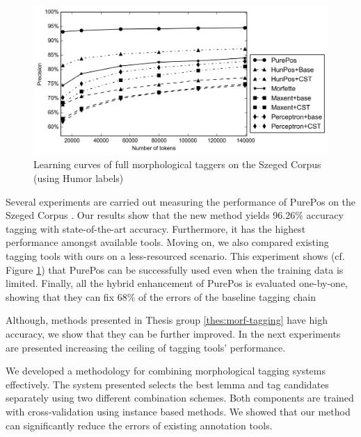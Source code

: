 \begin{figure}[H]
  \centering
  \includegraphics[width=1\textwidth]{MorphTagging/msd_token.png}
  \caption{Learning curves of full morphological taggers on the Szeged Corpus (using Humor labels)}
  \label{fig:humor-token_en}
\end{figure}

Several experiments are carried out measuring the performance of PurePos on the Szeged Corpus \cite{Csendes2004}.
Our results show that the new method yields 96.26\% accuracy tagging with state-of-the-art accuracy. %
Furthermore, it has the highest performance amongst available tools.
Moving on, we also compared existing tagging tools with ours on a less-resourced scenario.
This experiment shows (cf. Figure \ref{fig:humor-token_en}) that PurePos can be successfully used even when the training data is limited.
Finally, all the hybrid enhancement of PurePos is evaluated one-by-one, showing that they can fix 68\% of the errors of the baseline tagging chain 


\thesisline%

Although, methods presented in Thesis group \ref{thes:morf-tagging} have high accuracy, we show that they can be further improved.  
In the next experiments are presented increasing the ceiling of tagging tools' performance.


\begin{core}
\begin{thesis}
We developed a methodology for combining morphological tagging systems effectively.
The system presented selects the best lemma and tag candidates separately using two different combination schemes.
Both components are trained with cross-validation using instance based methods.
We showed that our method can significantly reduce the errors of existing annotation tools.
\end{thesis}

\begin{pub}
\cite{Laki2013a,Orosz2013c,Orosz2013d} 
\end{pub}
\end{core}

